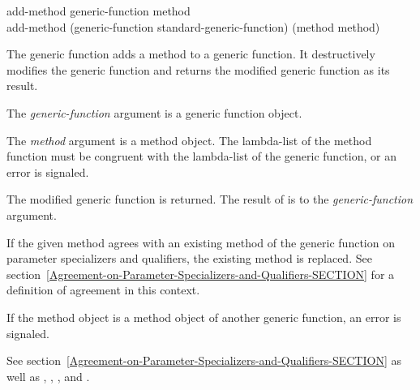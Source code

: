 \begin{defun}
add-method generic-function method \\
add-method (generic-function standard-generic-function) (method method)

The generic function  adds a method to a generic
function.  It destructively modifies the generic function and returns
the modified generic function as its result.


The \emph{generic-function\/} argument is a generic function
object.

The \emph{method\/} argument is a method object.  The lambda-list of
the method function must be congruent with the lambda-list of the
generic function, or an error is signaled.


The modified generic function is returned.  The result of  
is  to the \emph{generic-function\/} argument.


If the given method agrees with an existing method of the generic
function on parameter specializers and qualifiers, the existing method
is replaced.  See section~\ref{Agreement-on-Parameter-Specializers-and-Qualifiers-SECTION}
for a definition of agreement in this context.

If the method object is a method object of another generic function,
an error is signaled.

See section~\ref{Agreement-on-Parameter-Specializers-and-Qualifiers-SECTION}
as well as
,
,
,
and .
\end{defun}


